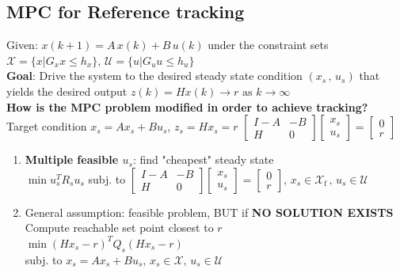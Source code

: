 \subsection{MPC for Reference tracking}
Given: $x(k+1)=A\,x(k)+B\,u(k)$ under the constraint sets $\mathcal{X}=\{x|G_xx\leq h_x\}$, $\mathcal{U}=\{u|G_uu\leq h_u\}$\\
\textbf{Goal}: Drive the system to the desired steady state condition $(x_s\,,\,u_s)$ that yields the desired output $z(k)=Hx(k)\rightarrow r \text{ as } k\rightarrow\infty$\\
\textbf{How is the MPC problem modified in order to achieve tracking?}\\
Target condition \rightarrow $x_s=Ax_s+Bu_s$, $z_s=Hx_s=r$ \Leftrightarrow $\begin{bmatrix}
    I-A &-B \\H&0
\end{bmatrix}\begin{bmatrix}
    x_s\\u_s
\end{bmatrix}=\begin{bmatrix}
    0\\r
\end{bmatrix}$\\
\begin{enumerate}
    \item \textbf{Multiple feasible $u_s$}: find "cheapest" steady state\\
    $\min u_s^TR_su_s$
    subj. to $\begin{bmatrix}
    I-A &-B \\H&0
\end{bmatrix}\begin{bmatrix}
    x_s\\u_s
\end{bmatrix}=\begin{bmatrix}
    0\\r
\end{bmatrix}$, $x_s\in\mathcal{X}_\text{f}\,,\,u_s\in\mathcal{U}$
\item General assumption: feasible problem, BUT if \textbf{NO SOLUTION EXISTS} \\\rightarrow Compute reachable set point closest to $r$\\
$\min (Hx_s-r)^TQ_s(Hx_s-r)$\\
subj. to $x_s=Ax_s+Bu_s,\,x_s\in\mathcal{X},\,u_s\in\mathcal{U}$

\end{enumerate}

